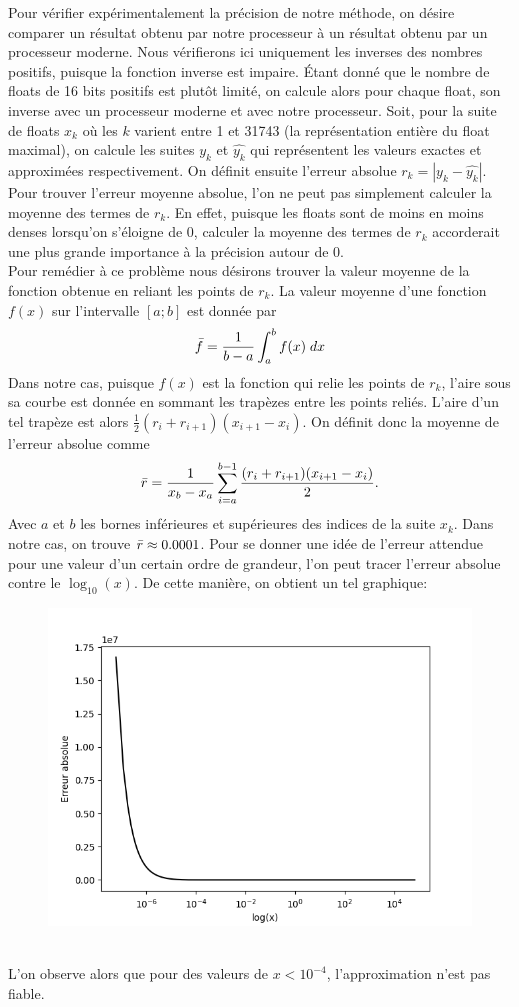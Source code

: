 \documentclass{article}
\begin{document}
Pour vérifier expérimentalement la précision de notre méthode, on désire comparer un résultat obtenu par notre processeur à un résultat obtenu par un processeur moderne. Nous vérifierons ici uniquement les inverses des nombres positifs, puisque la fonction inverse est impaire. Étant donné que le nombre de floats de 16 bits positifs est plutôt limité, on calcule alors pour chaque float, son inverse avec un processeur moderne et avec notre processeur. Soit, pour la suite de floats $x_k$ où les $k$ varient entre 1 et 31743 (la représentation entière du float maximal), on calcule les suites $y_k$ et $\hat{y_k}$ qui représentent les valeurs exactes et approximées respectivement. On définit ensuite l'erreur absolue $r_k = |y_k-\hat{y_k}|$. Pour trouver l'erreur moyenne absolue, l'on ne peut pas simplement calculer la moyenne des termes de $r_k$. En effet, puisque les floats sont de moins en moins denses lorsqu'on s'éloigne de 0, calculer la moyenne des termes de $r_k$ accorderait une plus grande importance à la précision autour de 0.\\
Pour remédier à ce problème nous désirons trouver la valeur moyenne de la fonction obtenue en reliant les points de $r_k$. La valeur moyenne d'une fonction $f(x)$ sur l'intervalle $[a;b]$ est donnée par
$$
\Bar{f} = \frac{1}{b-a}\int_a^bf(x)\;dx
$$
Dans notre cas, puisque $f(x)$ est la fonction qui relie les points de $r_k$, l'aire sous sa courbe est donnée en sommant les trapèzes entre les points reliés. L'aire d'un tel trapèze est alors $\frac12(r_i+r_{i+1})(x_{i+1}-x_i)$.
On définit donc la moyenne de l'erreur absolue comme
$$
\Bar{r} = \frac{1}{x_b-x_a}\sum_{i=a}^{b-1}\frac{(r_i+r_{i+1})(x_{i+1}-x_i)}2.
$$
Avec $a$ et $b$ les bornes inférieures et supérieures des indices de la suite $x_k$. Dans notre cas, on trouve $\Bar{r} \approx 0.0001$.
\newpage
Pour se donner une idée de l'erreur attendue pour une valeur d'un certain ordre de grandeur, l'on peut tracer l'erreur absolue contre le $\log_{10}(x)$. De cette manière, on obtient un tel graphique:
\begin{figure}[htp]
    \centering
    \includegraphics[width=12cm]{images/graph_inv.png}
    \label{fig:graph_inv.png}
\end{figure}\\
L'on observe alors que pour des valeurs de $x < 10^{-4}$, l'approximation n'est pas fiable.
\end{document}
